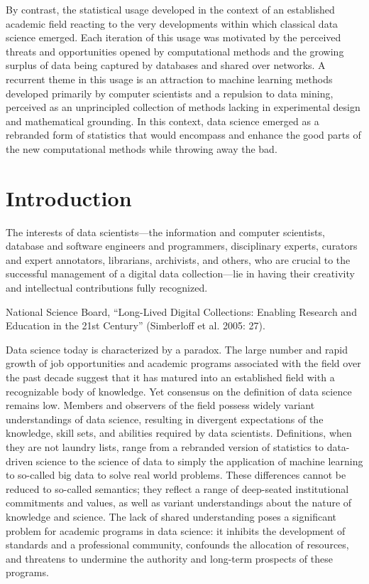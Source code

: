 \documentclass[
  letterpaper,
]{report}
\begin{document}
By contrast, the statistical usage developed in the context of an
established academic field reacting to the very developments within
which classical data science emerged. Each iteration of this usage was
motivated by the perceived threats and opportunities opened by
computational methods and the growing surplus of data being captured by
databases and shared over networks. A recurrent theme in this usage is
an attraction to machine learning methods developed primarily by
computer scientists and a repulsion to data mining, perceived as an
unprincipled collection of methods lacking in experimental design and
mathematical grounding. In this context, data science emerged as a
rebranded form of statistics that would encompass and enhance the good
parts of the new computational methods while throwing away the bad.

\hypertarget{introduction}{%
\chapter{Introduction}\label{introduction}}

The interests of data scientists---the information and computer
scientists, database and software engineers and programmers,
disciplinary experts, curators and expert annotators, librarians,
archivists, and others, who are crucial to the successful management of
a digital data collection---lie in having their creativity and
intellectual contributions fully recognized.

National Science Board, ``Long-Lived Digital Collections: Enabling
Research and Education in the 21st Century'' (Simberloff et al. 2005:
27).

Data science today is characterized by a paradox. The large number and
rapid growth of job opportunities and academic programs associated with
the field over the past decade suggest that it has matured into an
established field with a recognizable body of knowledge. Yet consensus
on the definition of data science remains low. Members and observers of
the field possess widely variant understandings of data science,
resulting in divergent expectations of the knowledge, skill sets, and
abilities required by data scientists. Definitions, when they are not
laundry lists, range from a rebranded version of statistics to
data-driven science to the science of data to simply the application of
machine learning to so-called big data to solve real world problems.
These differences cannot be reduced to so-called semantics; they reflect
a range of deep-seated institutional commitments and values, as well as
variant understandings about the nature of knowledge and science. The
lack of shared understanding poses a significant problem for academic
programs in data science: it inhibits the development of standards and a
professional community, confounds the allocation of resources, and
threatens to undermine the authority and long-term prospects of these
programs.
\end{document}
